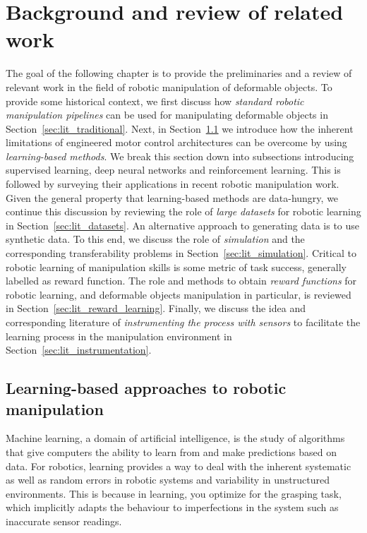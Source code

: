 \documentclass[\home/main.tex]{subfiles}
\begin{document}
\chapter{Background and review of related work} \label{ch:lit}

The goal of the following chapter is to provide the preliminaries and a review of relevant work in the field of robotic manipulation of deformable objects. To provide some historical context, we first discuss how \emph{standard robotic manipulation pipelines} can be used for manipulating deformable objects in Section~\ref{sec:lit_traditional}. Next, in Section~\ref{sec:lit_learning} we introduce how the inherent limitations of engineered motor control architectures can be overcome by using \emph{learning-based methods}. We break this section down into subsections introducing supervised learning, deep neural networks and reinforcement learning. This is followed by surveying their applications in recent robotic manipulation work. Given the general property that learning-based methods are data-hungry, we continue this discussion by reviewing the role of \emph{large datasets} for robotic learning in Section~\ref{sec:lit_datasets}. An alternative approach to generating data is to use synthetic data. To this end, we discuss the role of \emph{simulation} and the corresponding transferability problems in Section~\ref{sec:lit_simulation}. Critical to robotic learning of manipulation skills is some metric of task success, generally labelled as reward function. The role and methods to obtain \emph{reward functions} for robotic learning, and deformable objects manipulation in particular, is reviewed in Section~\ref{sec:lit_reward_learning}. Finally, we discuss the idea and corresponding literature of \emph{instrumenting the process with sensors} to facilitate the learning process in the manipulation environment in Section~\ref{sec:lit_instrumentation}.



\section{Learning-based approaches to robotic manipulation} \label{sec:lit_learning}

Machine learning, a domain of artificial intelligence, is the study of algorithms that give computers the ability to learn from and make predictions based on data. For robotics, learning provides a way to deal with the inherent systematic as well as random errors in robotic systems and variability in unstructured environments. This is because in learning, you optimize for the grasping task, which implicitly adapts the behaviour to imperfections in the system such as inaccurate sensor readings.
\end{document}
